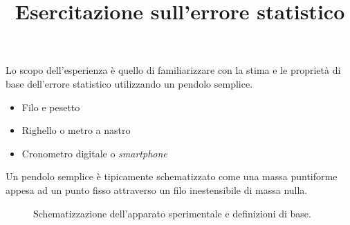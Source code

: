 \documentclass{lab1-article}
\title{Esercitazione sull'errore statistico}
\begin{document}
\begin{article}

\maketitle

\secintro
Lo scopo dell'esperienza \`e quello di familiarizzare con la stima e le
propriet\`a di base dell'errore statistico utilizzando un pendolo semplice.


\secmaterialsdad

\begin{itemize}
\item Filo e pesetto
\item Righello o metro a nastro
\item Cronometro digitale o \emph{smartphone}
\end{itemize}


\secdefinitions

Un pendolo semplice \`e tipicamente schematizzato come una massa puntiforme
appesa ad un punto fisso attraverso un filo inestensibile di massa nulla.

\begin{figure}[htb!]
  \caption{Schematizzazione dell'apparato sperimentale e definizioni di base.}
  \label{fig:pendolo}
\end{figure}


\end{article}
\end{document}
